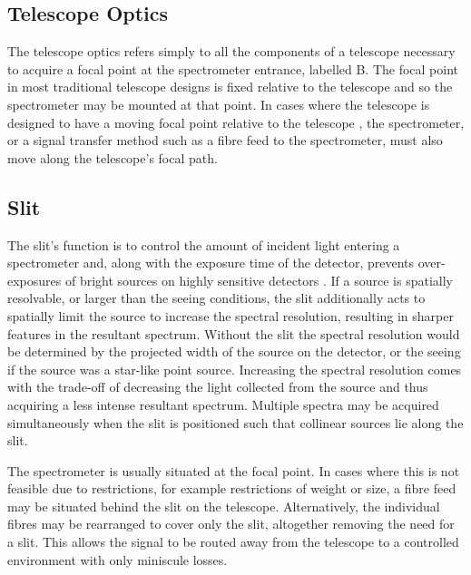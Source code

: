 \subsection{Telescope Optics}

The telescope optics refers simply to all the components of a telescope necessary to acquire a focal point at the spectrometer entrance, labelled B.
The focal point in most traditional telescope designs is fixed relative to the telescope and so the spectrometer may be mounted at that point.
In cases where the telescope is designed to have a moving focal point relative to the telescope \cite[see][]{Arecibo, HET, SALT_design}, the spectrometer, or a signal transfer method such as a fibre feed to the spectrometer, must also move along the telescope's focal path.

\subsection{Slit}

The slit's function is to control the amount of incident light entering a spectrometer and, along with the exposure time of the detector, prevents over-exposures of bright sources on highly sensitive detectors \citep{TonkPracAmSpec}.
If a source is spatially resolvable, or larger than the seeing conditions, the slit additionally acts to spatially limit the source to increase the spectral resolution, resulting in sharper features in the resultant spectrum.
Without the slit the spectral resolution would be determined by the projected width of the source on the detector, or the seeing if the source was a star-like point source.
Increasing the spectral resolution comes with the trade-off of decreasing the light collected from the source and thus acquiring a less intense resultant spectrum.
Multiple spectra may be acquired simultaneously when the slit is positioned such that collinear sources lie along the slit.

The spectrometer is usually situated at the focal point.
In cases where this is not feasible due to restrictions, for example restrictions of weight or size, a fibre feed may be situated behind the slit on the telescope.
Alternatively, the individual fibres may be rearranged to cover only the slit, altogether removing the need for a slit.
This allows the signal to be routed away from the telescope to a controlled environment with only miniscule losses.


